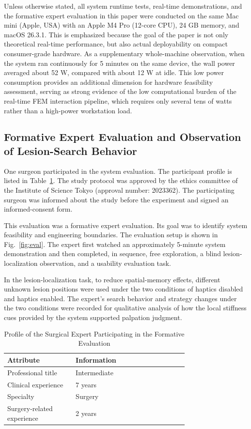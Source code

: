 \documentclass{ieeeaccess}
\begin{document}
Unless otherwise stated, all system runtime tests, real-time demonstrations, and the formative expert evaluation in this paper were conducted on the same Mac mini (Apple, USA) with an Apple M4 Pro (12-core CPU), 24 GB memory, and macOS 26.3.1. This is emphasized because the goal of the paper is not only theoretical real-time performance, but also actual deployability on compact consumer-grade hardware. As a supplementary whole-machine observation, when the system ran continuously for 5 minutes on the same device, the wall power averaged about 52 W, compared with about 12 W at idle. This low power consumption provides an additional dimension for hardware feasibility assessment, serving as strong evidence of the low computational burden of the real-time FEM interaction pipeline, which requires only several tens of watts rather than a high-power workstation load.

\subsection{Formative Expert Evaluation and Observation of Lesion-Search Behavior}
One surgeon participated in the system evaluation. The participant profile is listed in Table~\ref{tab:expert}. The study protocol was approved by the ethics committee of the Institute of Science Tokyo (approval number: 2023362). The participating surgeon was informed about the study before the experiment and signed an informed-consent form.

This evaluation was a formative expert evaluation. Its goal was to identify system feasibility and engineering boundaries. The evaluation setup is shown in Fig.~\ref{fig:eval}. The expert first watched an approximately 5-minute system demonstration and then completed, in sequence, free exploration, a blind lesion-localization observation, and a usability evaluation task.

In the lesion-localization task, to reduce spatial-memory effects, different unknown lesion positions were used under the two conditions of haptics disabled and haptics enabled. The expert's search behavior and strategy changes under the two conditions were recorded for qualitative analysis of how the local stiffness cues provided by the system supported palpation judgment.

\begin{table}[htbp]
\caption{Profile of the Surgical Expert Participating in the Formative Evaluation}
\label{tab:expert}
\centering
\footnotesize
\renewcommand{\arraystretch}{1.15}
\begin{tabular}{|p{0.28\linewidth}|p{0.46\linewidth}|}
\hline
Attribute & Information \\
\hline
Professional title & Intermediate \\
\hline
Clinical experience & 7 years \\
\hline
Specialty & Surgery \\
\hline
Surgery-related experience & 2 years \\
\hline
\end{tabular}
\end{table}
\end{document}
